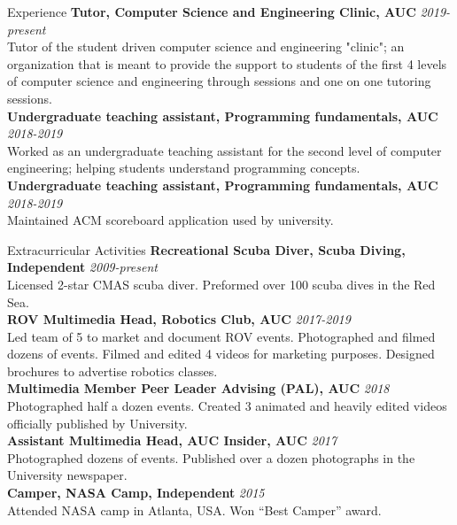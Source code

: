 \documentclass{resume}
\begin{document}
\begin{small}
	\begin{rSection}{Experience}
		{\bf Tutor, Computer Science and Engineering Clinic, AUC} \hfill {\em 2019-present} \\
		Tutor of the student driven computer science and engineering "clinic"; an organization that is meant to provide the support to students of the first 4 levels of computer science and engineering through sessions and one on one tutoring sessions.\\
		{\bf Undergraduate teaching assistant, Programming fundamentals, AUC} \hfill {\em 2018-2019} \\
		Worked as an undergraduate teaching assistant for the second level of computer engineering; helping students understand programming concepts.\\
		{\bf Undergraduate teaching assistant, Programming fundamentals, AUC} \hfill {\em 2018-2019} \\
		Maintained ACM scoreboard application used by university.\\
	\end{rSection}
	\begin{rSection} {Extracurricular Activities}
		{\bf Recreational Scuba Diver, Scuba Diving, Independent} \hfill {\em 2009-present}\\
		Licensed 2-star CMAS scuba diver. Preformed over 100 scuba dives in the Red Sea.\\
		{\bf ROV Multimedia Head, Robotics Club, AUC} \hfill {\em 2017-2019} \\
		Led team of 5 to market and document ROV events. Photographed and filmed dozens of events. Filmed and edited 4 videos for marketing purposes. Designed brochures to advertise robotics classes.\\
		{\bf Multimedia Member Peer Leader Advising (PAL), AUC} \hfill {\em 2018}\\
		Photographed half a dozen events. Created 3 animated and heavily edited videos officially published by University.\\
		{\bf Assistant Multimedia Head, AUC Insider, AUC} \hfill {\em 2017}\\
		Photographed dozens of events. Published over a dozen photographs in the University newspaper.\\
		{\bf Camper, NASA Camp, Independent} \hfill {\em 2015}\\
		Attended NASA camp in Atlanta, USA. Won “Best Camper” award.\\
		

\end{rSection}
\end{small}
\end{document}
